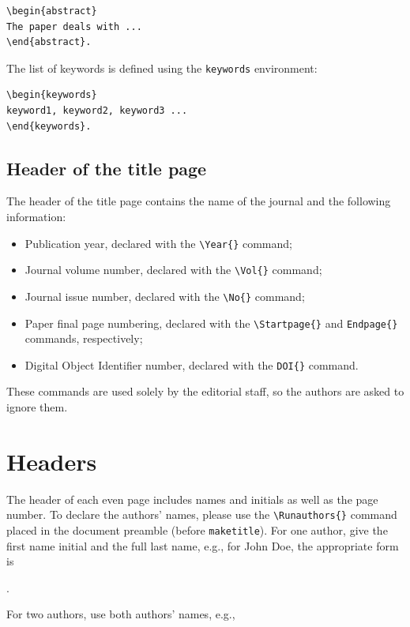 \documentclass{amcs}
\begin{document}
{\small \begin{verbatim}
\begin{abstract}
The paper deals with ...
\end{abstract}.
\end{verbatim}}

\noindent The list of keywords is defined using the \verb+keywords+ environment:

{\small \begin{verbatim}
\begin{keywords}
keyword1, keyword2, keyword3 ...
\end{keywords}.
\end{verbatim}}

\subsection{Header of the title page}
The header of the title page contains the name of the journal and the following information:
\begin{itemize}
  \item
    Publication year, declared with the \verb+\Year{}+ command;
  \item
    Journal volume number, declared with the \verb+\Vol{}+ command;
  \item
    Journal issue number, declared with the \verb+\No{}+ command;
  \item
    Paper final page numbering, declared with the \verb+\Startpage{}+ and \verb+Endpage{}+ commands, respectively;
  \item
    Digital Object Identifier number, declared with the \verb+DOI{}+ command.
\end{itemize}
These commands are used solely by the editorial staff, so the authors are asked to ignore them.

\section{Headers}
The header of each even page includes names and initials as well as the page number. To declare the authors' names, please use the \verb+\Runauthors{}+ command placed in the document preamble (before \verb+maketitle+). For one author, give the first name initial and the full last name, e.g., for John Doe, the appropriate form is

\medskip{}.

\medskip\noindent
For two authors, use both authors' names, e.g.,
\end{document}
